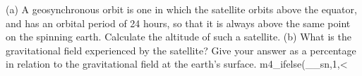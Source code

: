 (a) A geosynchronous orbit is one in which the satellite orbits above the
        equator, and has an orbital period of 24 hours, so that it is always above
        the same point on the spinning earth. 
        Calculate the altitude of such a satellite.\answercheck\hwendpart
        (b) What is the gravitational field experienced by the satellite? Give your
        answer as a percentage in relation to the gravitational field at the earth's
        surface.%
m4_ifelse(__sn,1,<%
\answercheck\hwendpart
